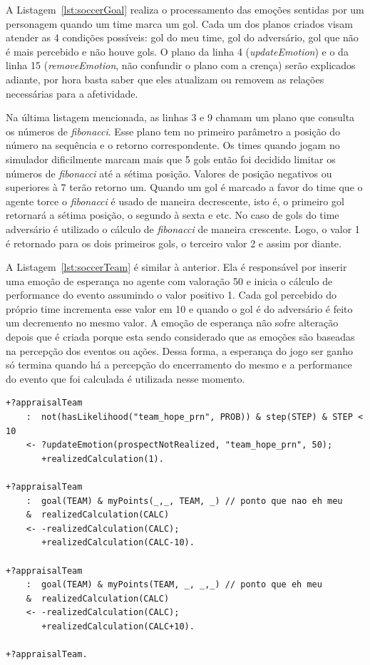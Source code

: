 A Listagem~\ref{lst:soccerGoal} realiza o processamento das emoções sentidas
por um personagem quando um time marca um gol. Cada um dos planos criados
visam atender as 4 condições possíveis: gol do meu time, gol do adversário,
gol que não é mais percebido e não houve gols. O plano da
linha 4 (\emph{updateEmotion}) e o da linha 15 (\emph{removeEmotion}, não
confundir o plano com a crença) serão explicados adiante, por hora basta saber
que eles atualizam ou removem as relações necessárias para a afetividade.

Na última listagem mencionada, as linhas 3 e 9 chamam um plano que consulta os números de
\emph{fibonacci}. Esse plano tem no primeiro parâmetro a posição do número na
sequência e o retorno correspondente.
Os times quando jogam no simulador dificilmente
marcam mais que 5 gols então foi decidido limitar os números de
\emph{fibonacci} até a sétima posição. Valores de posição negativos ou
superiores à 7 terão retorno um. Quando um gol é marcado
a favor do time que o agente torce o \emph{fibonacci} é usado de maneira
decrescente, isto é, o primeiro gol retornará a sétima posição, o segundo à
sexta e etc. No caso de gols do time adversário é utilizado o cálculo de
\emph{fibonacci} de maneira crescente. Logo, o valor 1 é retornado para os
dois primeiros gols, o terceiro valor 2 e assim por diante.

A Listagem~\ref{lst:soccerTeam} é similar à anterior. Ela é responsável por inserir uma
emoção de esperança no agente com valoração 50 e inicia o cálculo de
performance do evento assumindo o valor positivo 1. Cada gol percebido
do próprio time incrementa esse valor em 10 e quando o gol é do
adversário é feito um decremento no mesmo valor. A emoção de esperança não
sofre alteração depois que é criada porque esta sendo considerado que as
emoções são baseadas na percepção dos eventos ou ações. Dessa forma, a esperança do
jogo ser ganho só termina quando há a percepção do encerramento do mesmo e a
performance do evento que foi calculada é utilizada nesse momento.

\begin{center}
    \begin{minipage}{130mm}
	\lstset{linewidth=130mm}
	\begin{lstlisting}[frame=trbl,
caption=Parte do código do agente referente ao andamento do jogo.,
label=lst:soccerTeam]
+?appraisalTeam
    :  not(hasLikelihood("team_hope_prn", PROB)) & step(STEP) & STEP < 10
    <- ?updateEmotion(prospectNotRealized, "team_hope_prn", 50);
       +realizedCalculation(1).

+?appraisalTeam
    :  goal(TEAM) & myPoints(_,_, TEAM, _) // ponto que nao eh meu
    &  realizedCalculation(CALC)
    <- -realizedCalculation(CALC);
       +realizedCalculation(CALC-10).

+?appraisalTeam
    :  goal(TEAM) & myPoints(TEAM, _, _,_) // ponto que eh meu
    &  realizedCalculation(CALC)
    <- -realizedCalculation(CALC);
       +realizedCalculation(CALC+10).

+?appraisalTeam.
	\end{lstlisting}
    \end{minipage}
\end{center}

